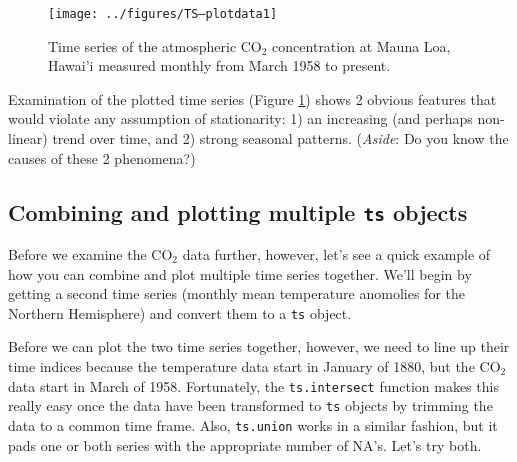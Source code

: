 \begin{figure}[htp]
\begin{center}
\texttt{[image: ../figures/TS--plotdata1]}
\end{center}
\caption{Time series of the atmospheric CO$_2$ concentration at Mauna Loa, Hawai'i measured monthly from March 1958 to present.}
\label{fig:LW1.CO2data}
\end{figure}

Examination of the plotted time series (Figure \ref{fig:LW1.CO2data}) shows 2 obvious features that would violate any assumption of stationarity: 1) an increasing (and perhaps non-linear) trend over time, and 2) strong seasonal patterns. (\emph{Aside}: Do you know the causes of these 2 phenomena?)

\subsection{Combining and plotting multiple \texttt{ts} objects}

Before we examine the CO$_2$ data further, however, let's see a quick example of how you can combine and plot multiple time series together. We'll begin by getting a second time series (monthly mean temperature anomolies for the Northern Hemisphere) and convert them to a \texttt{ts} object.

\begin{Schunk}
\end{Schunk}

Before we can plot the two time series together, however, we need to line up their time indices because the temperature data start in January of 1880, but the CO$_2$ data start in March of 1958.  Fortunately, the \texttt{ts.intersect} function makes this really easy once the data have been transformed to \texttt{ts} objects by trimming the data to a common time frame.  Also, \texttt{ts.union} works in a similar fashion, but it pads one or both series with the appropriate number of NA's.  Let's try both.

